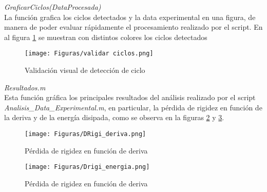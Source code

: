 \documentclass[a4paper, 11pt,article,oneside]{memoir}%
\begin{document}
 \textit{GraficarCiclos(DataProcesada)}\\
La función grafica los ciclos detectados y la data experimental en una figura, de manera de poder evaluar rápidamente el procesamiento realizado por el script. En al figura \ref{prepro6} se muestran con distintos colores los ciclos detectados
\begin{figure} [h!]
    \centering
    \texttt{[image: Figuras/validar ciclos.png]}
    \caption{\label{prepro6} Validación visual de  detección de ciclo}
    \end{figure}
\newpage\null\newpage
\textit{Resultados.m}\\
Esta función gráfica los principales resultados del análisis realizado por el script \textit{Analisis\_Data\_Experimental.m}, en particular, la pérdida de rigidez en función de la deriva y  de la energía disipada, como se observa en la figuras \ref{D_K_deriva} y \ref{D_K_energia}.
\begin{figure} [h!]
    \centering
    \texttt{[image: Figuras/DRigi\_deriva.png]}
    \caption{\label{D_K_deriva} Pérdida de rigidez en función de deriva}
    \end{figure}

\begin{figure} [h!]
    \centering
    \texttt{[image: Figuras/Drigi\_energia.png]}
    \caption{\label{D_K_energia} Pérdida de rigidez en función de deriva}
    \end{figure}
\end{document}
